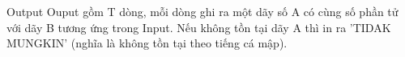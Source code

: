 Output
Ouput gồm T dòng, mỗi dòng ghi ra một dãy số A có cùng số phần tử với dãy B tương ứng trong Input. Nếu không tồn tại dãy A thì in ra 'TIDAK MUNGKIN' (nghĩa là không tồn tại theo tiếng cá mập).